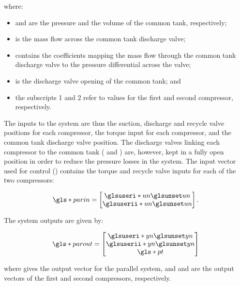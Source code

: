 \noindent where:

\begin{itemize}
  \item {} and  are the pressure and the volume of the common tank, respectively;
  \item {} is the mass flow across the common tank discharge valve;
  \item {} contains the coefficients mapping the mass flow through the common tank discharge valve to the pressure differential across the valve;
  \item {} is the discharge valve opening of the common tank; and
  \item the subscripts 1 and 2 refer to values for the first and second compressor, respectively.
\end{itemize}

The inputs to the system are thus the suction, discharge and recycle valve positions for each compressor, the torque input for each compressor, and the common tank discharge valve position.
The discharge valves linking each compressor to the common tank ( and ) are, however, kept in a fully open position in order to reduce the pressure losses in the system.
The input vector used for control () contains the torque and recycle valve inputs for each of the two compressors:

\begin{equation}
  \g{parin} = \begin{bmatrix} \gi{un} \\ \gii{un} \end{bmatrix}.
\end{equation}

The system outputs are given by:

\begin{equation}
  \g{parout} =
  \begin{bmatrix}
    \gi{yn}\\
    \gii{yn}\\
    \g{pt}
  \end{bmatrix}
\end{equation}

\noindent where  gives the output vector for the parallel system, and  and  are the output vectors of the first and second compressors, respectively.

